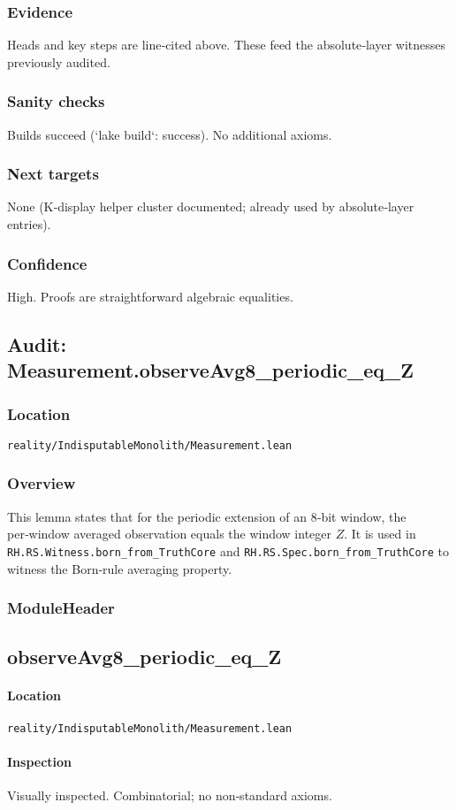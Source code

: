 \documentclass{article}
\newcommand{\FileRef}[1]{\texttt{#1}}
\newcommand{\ModuleHeader}[3]{%
  \subsection{#1}
  \paragraph{Location} \FileRef{#2}\\
  \paragraph{Inspection} #3
}
\begin{document}
\subsubsection{Evidence}
Heads and key steps are line‑cited above. These feed the absolute‑layer witnesses previously audited.

\subsubsection{Sanity checks}
Builds succeed (`lake build`: success). No additional axioms.

\subsubsection{Next targets}
None (K‑display helper cluster documented; already used by absolute‑layer entries).

\subsubsection{Confidence}
High. Proofs are straightforward algebraic equalities.

\subsection{Audit: Measurement.observeAvg8\_periodic\_eq\_Z}
\subsubsection{Location}
\FileRef{reality/IndisputableMonolith/Measurement.lean}

\subsubsection{Overview}
This lemma states that for the periodic extension of an 8‑bit window, the per‑window averaged observation equals the window integer \(Z\). It is used in \texttt{RH.RS.Witness.born\_from\_TruthCore} and \texttt{RH.RS.Spec.born\_from\_TruthCore} to witness the Born‑rule averaging property.

\subsubsection{ModuleHeader}
\ModuleHeader{observeAvg8\_periodic\_eq\_Z}{reality/IndisputableMonolith/Measurement.lean}{Visually inspected. Combinatorial; no non‑standard axioms.}
\end{document}
